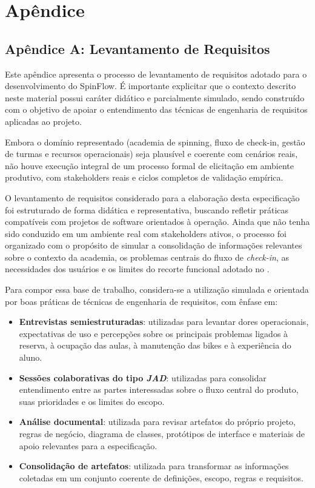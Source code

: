 \section*{Apêndice}

\subsection*{Apêndice A: Levantamento de Requisitos}
\hypertarget{ap:apendice}{}

Este apêndice apresenta o processo de levantamento de requisitos adotado para o desenvolvimento do SpinFlow. É importante explicitar que o contexto descrito neste material possui caráter didático e parcialmente simulado, sendo construído com o objetivo de apoiar o entendimento das técnicas de engenharia de requisitos aplicadas ao projeto.

Embora o domínio representado (academia de spinning, fluxo de check-in, gestão de turmas e recursos operacionais) seja plausível e coerente com cenários reais, não houve execução integral de um processo formal de elicitação em ambiente produtivo, com stakeholders reais e ciclos completos de validação empírica.

O levantamento de requisitos considerado para a elaboração desta especificação foi estruturado de forma didática e representativa, buscando refletir práticas compatíveis com projetos de software orientados à operação. Ainda que não tenha sido conduzido em um ambiente real com stakeholders ativos, o processo foi organizado com o propósito de simular a consolidação de informações relevantes sobre o contexto da academia, os problemas centrais do fluxo de \textit{check-in}, as necessidades dos usuários e os limites do recorte funcional adotado no \ProjetoNome.

Para compor essa base de trabalho, considera-se a utilização simulada e orientada por boas práticas de técnicas de engenharia de requisitos, com ênfase em:

\begin{itemize}[leftmargin=1.2cm]
\item \textbf{Entrevistas semiestruturadas}: utilizadas para levantar dores operacionais, expectativas de uso e percepções sobre os principais problemas ligados à reserva, à ocupação das aulas, à manutenção das bikes e à experiência do aluno.
\item \textbf{Sessões colaborativas do tipo \textit{JAD}}: utilizadas para consolidar entendimento entre as partes interessadas sobre o fluxo central do produto, suas prioridades e os limites do escopo.
\item \textbf{Análise documental}: utilizada para revisar artefatos do próprio projeto, regras de negócio, diagrama de classes, protótipos de interface e materiais de apoio relevantes para a especificação.
\item \textbf{Consolidação de artefatos}: utilizada para transformar as informações coletadas em um conjunto coerente de definições, escopo, regras e requisitos.
\end{itemize}

